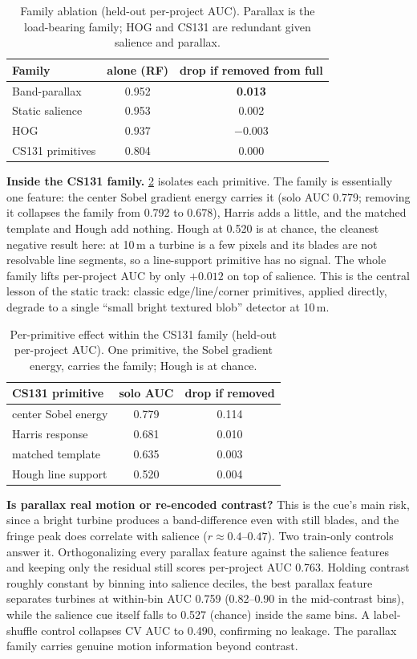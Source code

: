 \documentclass[10pt,twocolumn,letterpaper]{article}
\begin{document}
\begin{table}[t]
\centering
\small
\begin{tabular}{lcc}
\toprule
Family & alone (RF) & drop if removed from full \\
\midrule
Band-parallax & 0.952 & \textbf{0.013} \\
Static salience & 0.953 & 0.002 \\
HOG & 0.937 & $-0.003$ \\
CS131 primitives & 0.804 & 0.000 \\
\bottomrule
\end{tabular}
\caption{Family ablation (held-out per-project AUC). Parallax is the load-bearing family; HOG and CS131 are redundant given salience and parallax.}
\label{tab:family}
\end{table}

\textbf{Inside the CS131 family.} \cref{tab:cs131} isolates each primitive. The family is essentially one feature: the center Sobel gradient energy carries it (solo AUC 0.779; removing it collapses the family from 0.792 to 0.678), Harris adds a little, and the matched template and Hough add nothing. Hough at 0.520 is at chance, the cleanest negative result here: at 10\,m a turbine is a few pixels and its blades are not resolvable line segments, so a line-support primitive has no signal. The whole family lifts per-project AUC by only $+0.012$ on top of salience. This is the central lesson of the static track: classic edge/line/corner primitives, applied directly, degrade to a single ``small bright textured blob'' detector at 10\,m.

\begin{table}[t]
\centering
\small
\begin{tabular}{lcc}
\toprule
CS131 primitive & solo AUC & drop if removed \\
\midrule
center Sobel energy & 0.779 & 0.114 \\
Harris response & 0.681 & 0.010 \\
matched template & 0.635 & 0.003 \\
Hough line support & 0.520 & 0.004 \\
\bottomrule
\end{tabular}
\caption{Per-primitive effect within the CS131 family (held-out per-project AUC). One primitive, the Sobel gradient energy, carries the family; Hough is at chance.}
\label{tab:cs131}
\end{table}

\textbf{Is parallax real motion or re-encoded contrast?} This is the cue's main risk, since a bright turbine produces a band-difference even with still blades, and the fringe peak does correlate with salience ($r{\approx}0.4$--$0.47$). Two train-only controls answer it. Orthogonalizing every parallax feature against the salience features and keeping only the residual still scores per-project AUC 0.763. Holding contrast roughly constant by binning into salience deciles, the best parallax feature separates turbines at within-bin AUC 0.759 (0.82--0.90 in the mid-contrast bins), while the salience cue itself falls to 0.527 (chance) inside the same bins. A label-shuffle control collapses CV AUC to 0.490, confirming no leakage. The parallax family carries genuine motion information beyond contrast.
\end{document}
